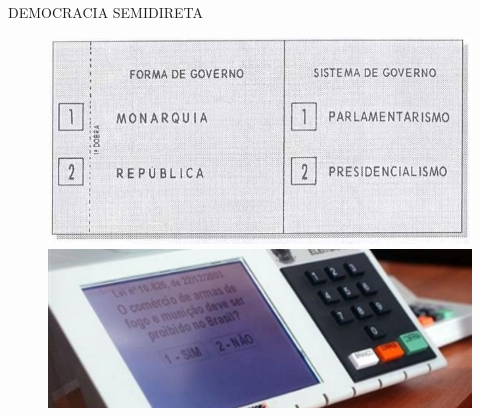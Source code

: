 \documentclass{Alexandre}
\begin{document}
\begin{frame}{DEMOCRACIA SEMIDIRETA}

    \begin{figure}
        \includegraphics[scale = 0.21]{Figuras/Plebiscito1993.jpg}
        \includegraphics[scale = 0.20]{Figuras/Referendo2005.jpg}
    \end{figure}

\end{frame}
\end{document}
